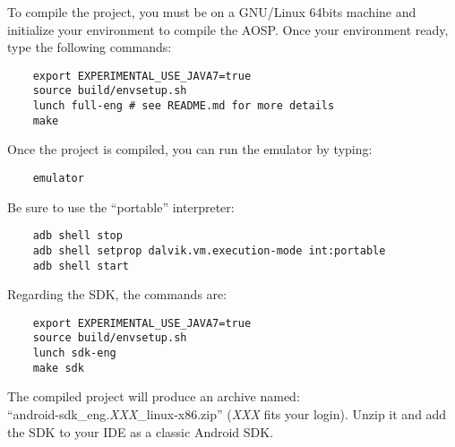 \documentclass{sig-alternate}
\begin{document}
  To compile the project, you must be on a GNU/Linux 64bits machine and initialize your environment to compile the AOSP\cite{android-sources}.
  Once your environment ready, type the following commands:
 
  {\scriptsize \begin{verbatim}
    export EXPERIMENTAL_USE_JAVA7=true
    source build/envsetup.sh
    lunch full-eng # see README.md for more details
    make
  \end{verbatim}}\vspace{-.8em}

  Once the project is compiled, you can run the emulator by typing:

  {\scriptsize \begin{verbatim}
    emulator
  \end{verbatim}}\vspace{-.8em}

  Be sure to use the ``portable'' interpreter:

  {\scriptsize \begin{verbatim}
    adb shell stop
    adb shell setprop dalvik.vm.execution-mode int:portable
    adb shell start
  \end{verbatim}}\vspace{-.8em}

  Regarding the SDK, the commands are:

  {\scriptsize \begin{verbatim}
    export EXPERIMENTAL_USE_JAVA7=true
    source build/envsetup.sh
    lunch sdk-eng
    make sdk
  \end{verbatim}}\vspace{-.8em}

  The compiled project will produce an archive named:\\
  ``android-sdk\_eng.{\it XXX}\_linux-x86.zip''
  ({\it XXX} fits your login).
  Unzip it and add the SDK to your IDE as a classic Android SDK.
\end{document}
